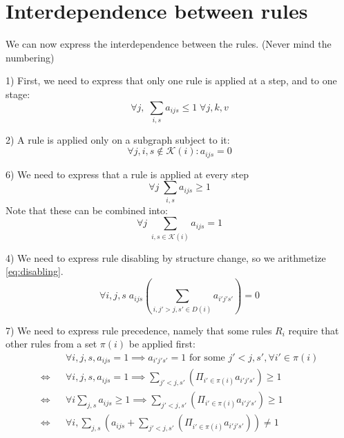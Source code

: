 \documentclass[11pt, oneside, reqno]{article}
\newcommand{\Kc}{\mathcal{K}}
\begin{document}
\section{Interdependence between rules}
We can now express the interdependence between the rules. 
(Never mind the numbering)

1) First, we need to express that only one rule is applied at a step, and to one stage:
\begin{equation}
\label{eq:oneruleinstepArithm}
\forall j, \; \sum_{i,s}a_{ijs}  \leq 1\; \forall j,k,v
\end{equation}

2) A rule is applied only on a subgraph subject to it:
\begin{equation}
\label{eq:ruleongraph}
\forall j,i,s \notin \Kc(i): a_{ijs} = 0
\end{equation}

6) We need to express that a rule is applied at every step
\begin{equation}
\label{eq:oneruleeverystepArithm}
\forall j\; \sum_{i,s}a_{ijs} \geq 1 
\end{equation}
Note that these can be combined into:
\begin{equation}
\label{eq:exactlyoneArithm}
\forall j\; \sum_{i,s \in \Kc(i)}a_{ijs} = 1 
\end{equation}


4) We need to express rule disabling by structure change, so we arithmetize \eqref{eq:disabling}.
\begin{equation}
\label{eq:disablingStructArithm}
\forall i,j,s \; a_{ijs}\left(\sum_{i,j'>j,s' \in D(i)}a_{i'j's'}\right) =0
\end{equation}

7) We need to express rule precedence, namely that some rules $R_i$ require that other rules from a set $\pi(i)$ be applied first:
\begin{eqnarray}
\label{eq:precedenceArithm}
&& \forall i,j,s, a_{ijs}=1 \implies a_{i'j's'}=1 \textrm{ for some } j'<j,s',\forall i'\in \pi(i)
\nonumber
\\
\Leftrightarrow && \forall i,j,s, a_{ijs}=1 \implies \sum_{j'<j,s'}\left(\Pi_{i'\in \pi(i)}a_{i'j's'}\right) \geq 1 
\nonumber
\\
\Leftrightarrow && \forall i \sum_{j,s}a_{ijs} \geq 1 \implies \sum_{j'<j,s'}\left(\Pi_{i'\in \pi(i)}a_{i'j's'}\right) \geq 1 
\nonumber
\\
\Leftrightarrow && \forall i, \sum_{j,s}\left(a_{ijs} + \sum_{j'<j,s'}\left(\Pi_{i'\in \pi(i)}a_{i'j's'}\right)\right) \neq 1 
\end{eqnarray}
\end{document}
